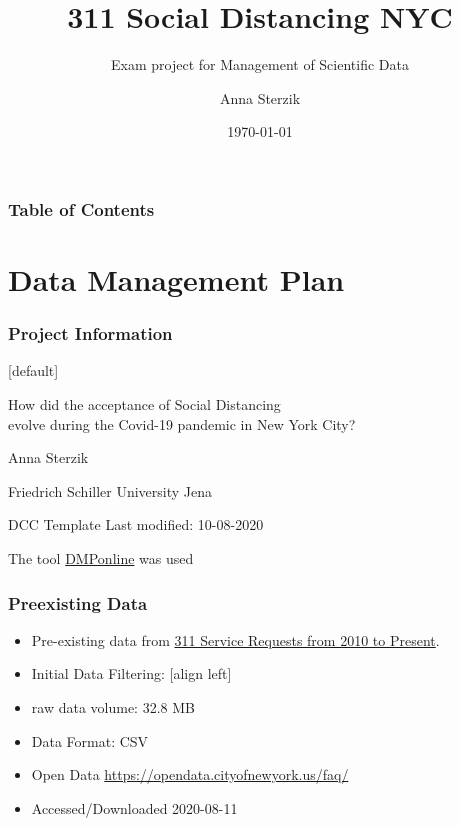 \documentclass{beamer}
\title{311 Social Distancing NYC}
\subtitle{Exam project for Management of Scientific Data}
\author{Anna Sterzik}
\institute{Friedrich Schiller Universität Jena}
\date{\today}
\begin{document}
\frame{\titlepage}
\begin{frame}
\frametitle{Table of Contents}
\tableofcontents
\end{frame}

\section{Data Management Plan}
\begin{frame}
\frametitle{Project Information}
[default]
\begin{description}[style=multiline]
\item[Project name:] How did the acceptance of Social Distancing\\ evolve during the Covid-19 pandemic in New York City?
\vfill
\item[Creator:] Anna Sterzik
\vfill
\item[Affiliation:] Friedrich Schiller University Jena
\vfill
\item[Template:] DCC Template
Last modified: 10-08-2020
\item The tool \href{https://dmponline.dcc.ac.uk/}{DMPonline} was used
\end{description}

\end{frame}
\begin{frame}
\frametitle{Preexisting Data}
\begin{itemize}
\item Pre-existing data from \href{https://data.cityofnewyork.us/Social-Services/311-Service-Requests-from-2010-to-Present/erm2-nwe9}{311 Service Requests from 2010 to Present}.
\vfill
\item Initial Data Filtering:
[align left]
\vfill
\item raw data volume: 32.8 MB
\vfill
\item Data Format: CSV
\vfill
\item Open Data \url{https://opendata.cityofnewyork.us/faq/}
\vfill
\item Accessed/Downloaded 2020-08-11
\end{itemize}
\end{frame}
\end{document}
